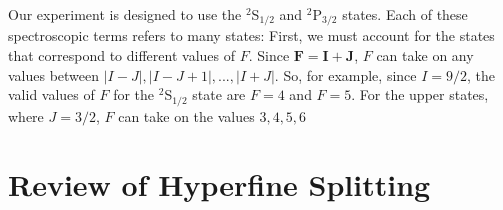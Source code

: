 
Our experiment is designed to use the $^2$S$_{1/2}$ and $^2$P$_{3/2}$ states. Each of these spectroscopic terms refers to many states: First, we must account for the states that correspond to different values of $F$. Since $\mathbf{F}=\mathbf{I}+\mathbf{J}$, $F$ can take on any values between $|I-J|,|I-J+1|,...,|I+J|$. So, for example, since $I=9/2$, the valid values of $F$ for the $^2$S$_{1/2}$ state are $F=4$ and $F=5$. For the upper states, where $J=3/2$, $F$ can take on the values $3,4,5,6$ 

%


\section{Review of Hyperfine Splitting}

